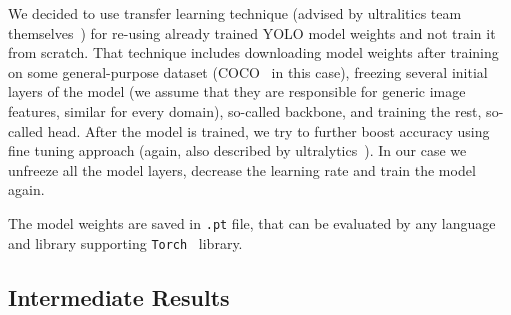 \documentclass[10pt,twocolumn,letterpaper]{article}
\begin{document}
We decided to use transfer learning technique (advised by ultralitics team themselves~\cite{ultralytics2024transferlearning}) for re-using already trained YOLO model weights and not train it from scratch.
That technique includes downloading model weights after training on some general-purpose dataset (COCO~\cite{lin2015microsoftcococommonobjects} in this case), freezing several initial layers of the model (we assume that they are responsible for generic image features, similar for every domain), so-called backbone, and training the rest, so-called head.
After the model is trained, we try to further boost accuracy using fine tuning approach (again, also described by ultralytics~\cite{ultralytics2024finetuning}).
In our case we unfreeze all the model layers, decrease the learning rate and train the model again.

The model weights are saved in \texttt{.pt} file, that can be evaluated by any language and library supporting \texttt{Torch}~\cite{torchlibrary} library.

\subsection{Intermediate Results}




{
    \small
    
    
}
\end{document}
